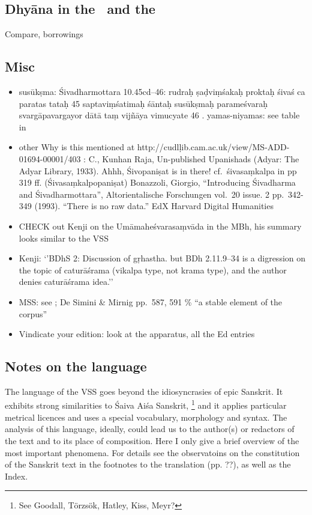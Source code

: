 \documentclass[11pt]{book}
\begin{document}
\subsection{Dhyāna in the \VSS\ and the \DHARMP}

Compare, borrowings

\subsection{Misc}

\begin{itemize}
\item
  susūkṣma: Śivadharmottara 10.45cd--46: rudraḥ ṣaḍviṃśakaḥ proktaḥ
  śivaś ca paratas tataḥ \textbar{}\textbar{} 45 \textbar{}\textbar{}
  saptaviṃśatimaḥ śāntaḥ susūkṣmaḥ parameśvaraḥ \textbar{}
  svargāpavargayor dātā taṃ vijñāya vimucyate \textbar{}\textbar{} 46
  \textbar{}\textbar{}. yamas-niyamas: see table in 
\item
  other Why is this mentioned at
  http://cudlḷib.cam.ac.uk/view/MS-ADD-01694-00001/403 : C., Kunhan
  Raja, Un-published Upanishads (Adyar: The Adyar Library, 1933). Ahhh,
  Śivopaniṣat is in there! cf.~śivasaṃkalpa in pp 319 ff.
  (Śivasaṃkalpopaniṣat) Bonazzoli, Giorgio, ``Introducing Śivadharma and
  Śivadharmottara'', Altorientalische Forschungen vol.~20 issue. 2
  pp.~342-349 (1993). ``There is no raw data.'' EdX Harvard Digital
  Humanities
\item
  CHECK out Kenji on the Umāmaheśvarasaṃvāda in the MBh, his summary
  looks similar to the VSS
\item
  Kenji: `'BDhS 2: Discussion of gṛhastha. but BDh 2.11.9--34 is a
  digression on the topic of caturāśrama (vikalpa type, not krama type),
  and the author denies caturāśrama idea.''
\item
  MSS: see ; 
  De Simini \& Mirnig
  pp.~587, 591 \% ``a stable element of the corpus''
\item
  Vindicate your edition: look at the apparatus, all the Ed entries
\end{itemize}



\vfill
\pagebreak


\subsection{Notes on the language}

\noindent
The language of the VSS goes beyond the idiosyncrasies of epic Sanskrit.
It exhibits strong similarities to Śaiva Aiśa Sanskrit,%
		\footnote{See Goodall, Törzsök, Hatley, Kiss, Meyr?} 
and it applies particular metrical licences and 
uses a special vocabulary, morphology and syntax.
The analysis of this language, ideally, could lead us to the 
author(s) or redactors of the text and to its
place of composition. Here I only give a brief overview of the most
important phenomena. For details see the observatoins 
on the constitution of the Sanskrit text in the footnotes 
to the translation (pp. ??), as well as the Index.
\end{document}
